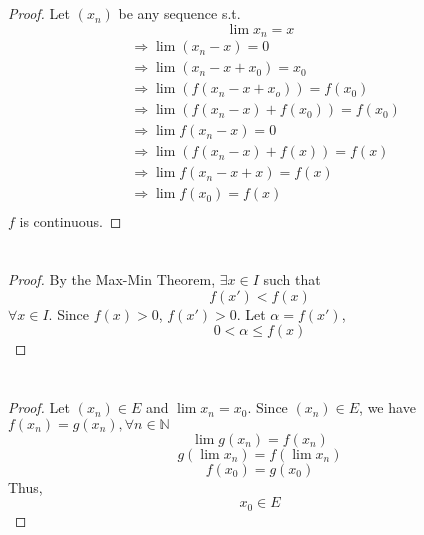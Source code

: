 \documentclass{article}
\begin{document}
    \section{}
        \begin{proof}
            Let $(x_n)$ be any sequence s.t.$$\lim x_n=x$$
            \begin{equation*}
                \begin{split}
                    &\Rightarrow\lim (x_n-x)=0\\
                    &\Rightarrow\lim (x_n-x+x_0)=x_0\\
                    &\Rightarrow\lim (f(x_n-x+x_o))=f(x_0)\\
                    &\Rightarrow\lim (f(x_n-x)+f(x_0))=f(x_0)\\
                    &\Rightarrow\lim f(x_n-x)=0\\
                    &\Rightarrow\lim (f(x_n-x)+f(x))=f(x)\\
                    &\Rightarrow\lim f(x_n-x+x)=f(x)\\
                    &\Rightarrow\lim f(x_0)=f(x)\\
                \end{split}
            \end{equation*}
            $f$ is continuous.
        \end{proof}

    \section{}
        \begin{proof}
            By the Max-Min Theorem, $\exists x\in I$ such that
            $$f(x')<f(x)$$
        $\forall x\in I$.
        Since $f(x)>0$, $f(x')>0$. Let $\alpha=f(x')$,
        $$0<\alpha\leq f(x)$$
        \end{proof}

    \section{}
        \begin{proof}       
            Let $(x_n)\in E$ and $\lim x_n=x_0$. Since $(x_n)\in E$, we have $f(x_n)=g(x_n),\forall n\in \mathbb{N}$
            $$\lim g(x_n)=f(x_n)$$
            $$g(\lim x_n)=f(\lim x_n)$$
            $$f(x_0)=g(x_0)$$
            Thus,
            $$x_0\in E$$
        \end{proof}   
        
\end{document}
